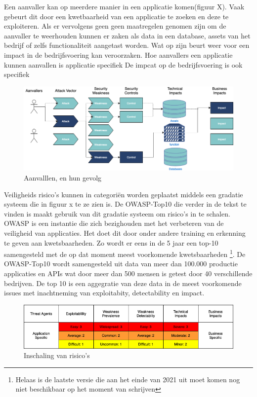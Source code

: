 Een aanvaller kan op meerdere manier in een applicatie komen(figuur X). Vaak gebeurt dit door een kwetbaarheid van een applicatie te zoeken en deze te exploiteren. Als er vervolgens geen geen maatregelen genomen zijn om de aanvaller te weerhouden kunnen er zaken als data in een database, assets van het bedrijf of zelfs functionaliteit aangetast worden. Wat op zijn beurt weer voor een impact in de bedrijfsvoering kan veroorzaken. Hoe aanvallers een applicatie kunnen aanvallen is applicatie specifiek De impcat op de bedrijfsvoering is ook specifiek
\begin{figure}[H]
\myfloatalign
\includegraphics[width=15cm]{gfx/application security routes}
\caption{Aanvalllen, en hun gevolg}
\label{fig:Application Security Routes}
\end{figure}

Veiligheids risico's kunnen in categori\"en worden geplaatst middels een gradatie systeem die in figuur x te ze zien is.
De OWASP-Top10 die verder in de tekst te vinden is maakt gebruik van dit gradatie systeem om risico's in te schalen.
OWASP is een instantie die zich bezighouden met het verbeteren van de veiligheid van applicaties. Het doet dit door onder andere training en erkenning te geven aan kwetsbaarheden.
Zo wordt er eens in de 5 jaar een top-10 samengesteld met de op dat moment meest voorkomende kwetsbaarheden \footnote{Helaas is de laatste versie die aan het einde van 2021 uit moet komen nog niet beschikbaar op het moment van schrijven}.
De OWASP-Top10 wordt samengesteld uit data van meer dan 100.000 productie applicaties en APIs wat door meer dan 500 mensen is getest door 40 verschillende bedrijven.
De top 10 is een aggegratie van deze data in de meest voorkomende issues met inachtneming van exploitabity, detectability en impact.


\begin{figure}[H]
\myfloatalign
\includegraphics[width=12cm]{gfx/risk tabel}
\caption{Inschaling van risico's}
\label{fig:risico inschaling}
\end{figure}

